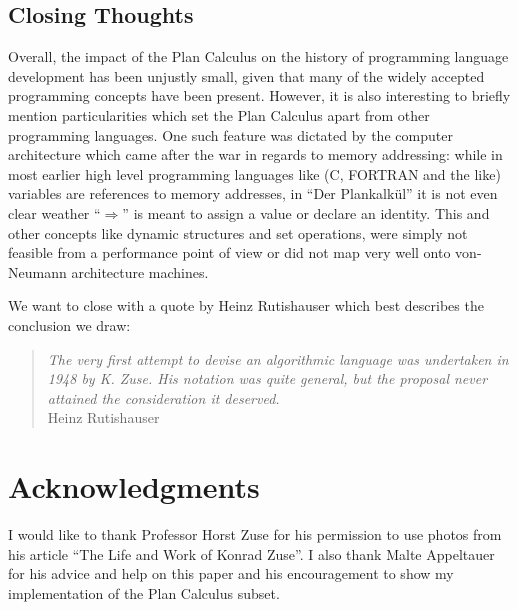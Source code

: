 \documentclass{llncs}
\begin{document}
   \subsection{Closing Thoughts}
   Overall, the impact of the Plan Calculus on the history of programming language
   development has been unjustly small, given that many of the widely accepted programming 
   concepts have been present. However, it is also interesting to briefly mention 
   particularities which set the Plan Calculus apart from other programming languages. 
   One such feature was dictated by the computer architecture which came after 
   the war in regards to memory addressing: while in most earlier high level programming 
   languages like (C, FORTRAN and the like) variables are references to memory addresses, 
   in ``Der Plankalkül'' it is not even clear weather ``$\Rightarrow$'' is meant to assign a value 
   or declare an identity. This and other concepts like dynamic structures and set 
   operations, were simply not feasible from a performance point of view 
   or did not map very well onto von-Neumann architecture machines.

   We want to close with a quote by Heinz Rutishauser which best describes the 
   conclusion we draw:
   \begin{quote}
   \raggedright
   {\it The very first attempt to devise an algorithmic language was undertaken in 1948 by K. Zuse. His notation 
   was quite general, but the proposal never attained the consideration it deserved.}\\
   \raggedleft Heinz Rutishauser
   \end{quote}
 \clearpage
 \section*{Acknowledgments}
   I would like to thank Professor Horst Zuse for his permission to use photos from his article 
   ``The Life and Work of Konrad Zuse''. I also thank Malte Appeltauer for his advice and help 
   on this paper and his encouragement to show my implementation of the Plan Calculus subset.
  
  
  \clearpage
\end{document}
